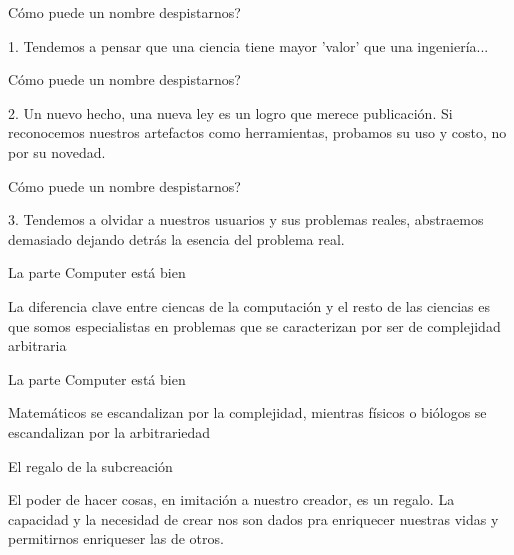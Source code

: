 \documentclass{beamer}
\begin{document}
\begin{frame}{Cómo puede un nombre despistarnos?}
\begin{center}
1. Tendemos a pensar que una ciencia tiene mayor 'valor'
que una ingeniería...
\newline
\end{center}
\end{frame}
\begin{frame}{Cómo puede un nombre despistarnos?}
\begin{center}
2. Un nuevo hecho, una nueva ley es un logro que
merece publicación.
\newline
Si reconocemos nuestros artefactos como herramientas, 
probamos su uso y costo, no por su novedad.
\end{center}
\end{frame}
\begin{frame}{Cómo puede un nombre despistarnos?}
\begin{center}
3. Tendemos a olvidar a nuestros usuarios y sus problemas reales,
abstraemos demasiado dejando detrás la esencia del problema real.
\end{center}
\end{frame}

\begin{frame}{La parte Computer está bien}
\begin{center}
La diferencia clave entre ciencas de la computación
y el resto de las ciencias es que somos especialistas en problemas 
que se caracterizan por ser de complejidad arbitraria
\end{center}
\end{frame}

\begin{frame}{La parte Computer está bien}
\begin{center}
Matemáticos se escandalizan por la complejidad, 
mientras físicos o biólogos se escandalizan por 
la arbitrariedad
\end{center}
\end{frame}

\begin{frame}{El regalo de la subcreación}
\begin{center}
El poder de hacer cosas, en imitación a nuestro creador, es un regalo.
\newline
La capacidad y la necesidad de crear nos son dados pra enriquecer nuestras vidas 
y permitirnos enriqueser las de otros.
\end{center}
\end{frame}
\end{document}
